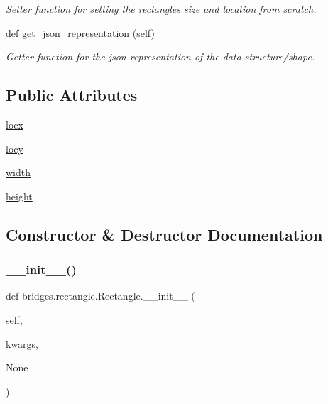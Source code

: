 \begin{DoxyCompactItemize}
\begin{DoxyCompactList}\small\item\em Setter function for setting the rectangles size and location from scratch. \end{DoxyCompactList}\item 
def \hyperlink{classbridges_1_1rectangle_1_1_rectangle_abed807aa2b797312357395f874577a64}{get\+\_\+json\+\_\+representation} (self)
\begin{DoxyCompactList}\small\item\em Getter function for the json representation of the data structure/shape. \end{DoxyCompactList}\end{DoxyCompactItemize}
\subsection*{Public Attributes}
\begin{DoxyCompactItemize}
\item 
\hyperlink{classbridges_1_1rectangle_1_1_rectangle_adaf5da189e098dd7ff9875025723a4df}{locx}
\item 
\hyperlink{classbridges_1_1rectangle_1_1_rectangle_a85aebe3e2b5470bda5ad6c25d456111e}{locy}
\item 
\hyperlink{classbridges_1_1rectangle_1_1_rectangle_ac70360e861fb0dfab5fae8525ffc86ba}{width}
\item 
\hyperlink{classbridges_1_1rectangle_1_1_rectangle_a3b7a2448881d5eea95e86aac8dfae467}{height}
\end{DoxyCompactItemize}


\subsection{Constructor \& Destructor Documentation}
\mbox{\label{classbridges_1_1rectangle_1_1_rectangle_aad5cb2fdd1da2686fb67de2150f55d42}} 
\subsubsection{\texorpdfstring{\+\_\+\+\_\+init\+\_\+\+\_\+()}{\_\_init\_\_()}}
{\footnotesize\ttfamily def bridges.\+rectangle.\+Rectangle.\+\_\+\+\_\+init\+\_\+\+\_\+ (\begin{DoxyParamCaption}\item[{}]{self,  }\item[{}]{kwargs,  }\item[{}]{None }\end{DoxyParamCaption})}



